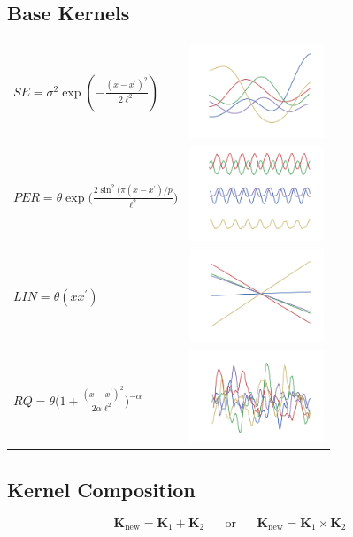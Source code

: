 \documentclass[a0,portrait]{a0poster}
\begin{document}
\begin{multicols}{3}
\subsection*{Base Kernels}

 \begin{center} 
\begin{tabular}{m{11.5cm} m{4cm}}
\small
$SE = \sigma^2 \exp(-\frac{(x-x^\prime)^2}{2\ell^2})$&\includegraphics[width=4cm]{gpSamples/se.png} \\
$PER = \theta \exp \bigg( \frac{2 \sin^2 ( \pi (x - x^\prime)/p}{\ell^2} \bigg)$&\includegraphics[width=4cm]{gpSamples/per.png}\\
$LIN = \theta (x x^\prime)$                          &\includegraphics[width=4cm]{gpSamples/lin.png}\\
$RQ =   \theta \bigg(1 + \frac{(x - x^\prime)^2}{2 \alpha \ell^2} \bigg)^{-\alpha}$&\includegraphics[width=4cm]{gpSamples/rq.png}
\end{tabular}
\end{center}
\subsection*{Kernel Composition}
\begin{equation*}
\mathbf{K}_{\textrm{new}} = \mathbf{K}_1 + \mathbf{K}_2 \;\;\;\;\;\;\text{or}\;\;\;\;\;\; \mathbf{K}_{\textrm{new}} = \mathbf{K}_1 \times \mathbf{K}_2 
\end{equation*}


\end{multicols}
\end{document}
